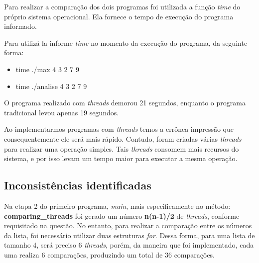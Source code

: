   Para realizar a comparação dos dois programas foi utilizada a função \textit{time} do próprio sistema operacional. Ela fornece o tempo de execução do programa informado.

  Para utilizá-la informe \textit{time} no momento da execução do programa, da seguinte forma:

  \begin{itemize}
    \item time ./max 4 3 2 7 9
    \item time ./analise 4 3 2 7 9
  \end{itemize}

  O programa realizado com \textit{threads} demorou 21 segundos, enquanto o programa tradicional levou apenas 19 segundos.

  Ao implementarmos programas com \textit{threads} temos a errônea impressão que consequentemente ele será mais rápido. Contudo, foram criadas várias \textit{threads} para realizar uma operação simples. Tais \textit{threads} consomem mais recursos do sistema, e por isso levam um tempo maior para executar a mesma operação.

  \subsection{Inconsistências identificadas}

  Na etapa 2 do primeiro programa, \textit{main}, mais especificamente no método: \textbf{comparing\_threads} foi gerado um número \textbf{n(n-1)/2} de \textit{threads}, conforme requisitado na questão. No entanto, para realizar a comparação entre os números da lista, foi necessário utilizar duas estruturas \textit{for}. Dessa forma, para uma lista de tamanho 4, será preciso 6 \textit{threads}, porém, da maneira que foi implementado, cada uma realiza 6 comparações, produzindo um total de 36 comparações.
